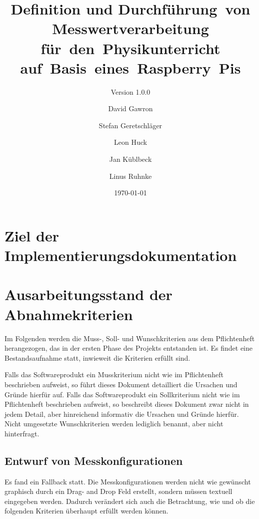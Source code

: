 \documentclass[parskip=full]{scrartcl}
\title{Definition und Durchführung~von Messwertverarbeitung für~den~Physikunterricht auf~Basis~eines~Raspberry~Pis}
\subtitle{Version 1.0.0}
\author{David Gawron \and Stefan Geretschläger \and Leon Huck \and Jan Küblbeck \and Linus Ruhnke}
\date{\today}
\begin{document}
\maketitle

\clearpage
\tableofcontents 					%

\clearpage
\section{Ziel der Implementierungsdokumentation} \label{einleitung}

\clearpage
\section{Ausarbeitungsstand der Abnahmekriterien} \label{Ausarbeitungsstand}

Im Folgenden werden die Muss-, Soll- und Wunschkriterien aus dem Pflichtenheft herangezogen, das in der ersten Phase des Projekts entstanden ist. Es findet eine Bestandsaufnahme statt, inwieweit die Kriterien erfüllt sind. 

Falls das Softwareprodukt ein Musskriterium nicht wie im Pflichtenheft beschrieben aufweist, so führt dieses Dokument detailliert die Ursachen und Gründe hierfür auf. Falls das Softwareprodukt ein Sollkriterium nicht wie im Pflichtenheft beschrieben aufweist, so beschreibt dieses Dokument zwar nicht in jedem Detail, aber hinreichend informativ die Ursachen und Gründe hierfür. Nicht umgesetzte Wunschkriterien werden lediglich benannt, aber nicht hinterfragt. 

\subsection{Entwurf von Messkonfigurationen}
Es fand ein Fallback statt. Die Messkonfigurationen werden nicht wie gewünscht graphisch durch ein Drag- and Drop Feld erstellt, sondern müssen textuell eingegeben werden. Dadurch verändert sich auch die Betrachtung, wie und ob die folgenden Kriterien überhaupt erfüllt werden können.
\end{document}
